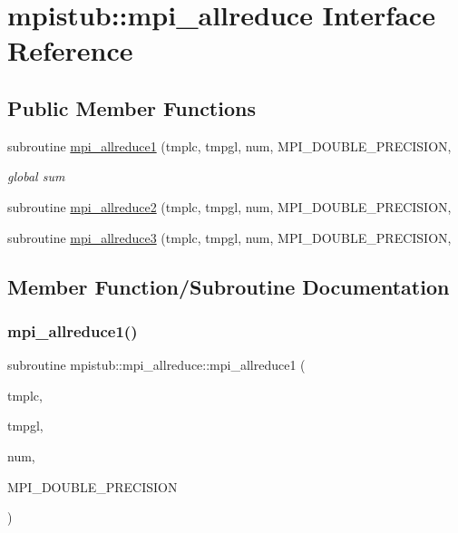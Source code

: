 \hypertarget{interfacempistub_1_1mpi__allreduce}{}\section{mpistub\+::mpi\+\_\+allreduce Interface Reference}
\label{interfacempistub_1_1mpi__allreduce}
\subsection*{Public Member Functions}
\begin{DoxyCompactItemize}
\item 
subroutine \mbox{\hyperlink{interfacempistub_1_1mpi__allreduce_ac5076ac67e219427564fef9f3b8eeaeb}{mpi\+\_\+allreduce1}} (tmplc, tmpgl, num, M\+P\+I\+\_\+\+D\+O\+U\+B\+L\+E\+\_\+\+P\+R\+E\+C\+I\+S\+I\+ON,
\begin{DoxyCompactList}\small\item\em global sum \end{DoxyCompactList}\item 
subroutine \mbox{\hyperlink{interfacempistub_1_1mpi__allreduce_a62ed31b1f8d75b7c750a905470bef81a}{mpi\+\_\+allreduce2}} (tmplc, tmpgl, num, M\+P\+I\+\_\+\+D\+O\+U\+B\+L\+E\+\_\+\+P\+R\+E\+C\+I\+S\+I\+ON,
\item 
subroutine \mbox{\hyperlink{interfacempistub_1_1mpi__allreduce_a84ae4c6bc4f8ba767aa88ab96a6a9a81}{mpi\+\_\+allreduce3}} (tmplc, tmpgl, num, M\+P\+I\+\_\+\+D\+O\+U\+B\+L\+E\+\_\+\+P\+R\+E\+C\+I\+S\+I\+ON,
\end{DoxyCompactItemize}


\subsection{Member Function/\+Subroutine Documentation}
\mbox{\label{interfacempistub_1_1mpi__allreduce_ac5076ac67e219427564fef9f3b8eeaeb}} 
\subsubsection{\texorpdfstring{mpi\_allreduce1()}{mpi\_allreduce1()}}
{\footnotesize\ttfamily subroutine mpistub\+::mpi\+\_\+allreduce\+::mpi\+\_\+allreduce1 (\begin{DoxyParamCaption}\item[{double precision, dimension(\+:)}]{tmplc,  }\item[{double precision, dimension(\+:)}]{tmpgl,  }\item[{}]{num,  }\item[{}]{M\+P\+I\+\_\+\+D\+O\+U\+B\+L\+E\+\_\+\+P\+R\+E\+C\+I\+S\+I\+ON }\end{DoxyParamCaption})}



